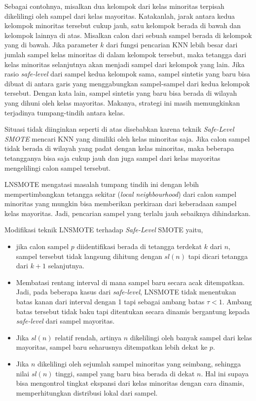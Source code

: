 Sebagai contohnya, misalkan dua kelompok dari kelas minoritas terpisah
dikelilingi oleh sampel dari kelas mayoritas.
Katakanlah, jarak antara kedua kelompok minoritas tersebut cukup jauh, satu
kelompok berada di bawah dan kelompok lainnya di atas.
Misalkan calon dari sebuah sampel berada di kelompok yang di bawah.
Jika parameter $ k $ dari fungsi pencarian KNN lebih besar dari jumlah sampel
kelas minoritas di dalam kelompok tersebut, maka tetangga dari kelas minoritas
selanjutnya akan menjadi sampel dari kelompok yang lain.
Jika rasio \textit{safe-level} dari sampel kedua kelompok sama, sampel sintetis
yang baru bisa dibuat di antara garis yang menggabungkan sampel-sampel dari
kedua kelompok tersebut.
Dengan kata lain, sampel sintetis yang baru bisa berada di wilayah yang dihuni
oleh kelas mayoritas.
Makanya, strategi ini masih memungkinkan terjadinya tumpang-tindih antara
kelas.

Situasi tidak diinginkan seperti di atas disebabkan karena teknik
\textit{Safe-Level SMOTE} mencari KNN yang dimiliki oleh kelas minoritas saja.
Jika calon sampel tidak berada di wilayah yang padat dengan kelas minoritas,
maka beberapa tetangganya bisa saja cukup jauh dan juga sampel dari kelas
mayoritas mengelilingi calon sampel tersebut.

LNSMOTE mengatasi masalah tumpang tindih ini dengan lebih mempertimbangkan
tetangga sekitar
(\textit{local neighbourhood})
dari calon sampel minoritas yang mungkin bisa memberikan perkiraan dari
keberadaan sampel kelas mayoritas.
Jadi, pencarian sampel yang terlalu jauh sebaiknya dihindarkan.

Modifikasi teknik LNSMOTE terhadap \textit{Safe-Level} SMOTE yaitu,
\begin{itemize}
\item jika calon sampel $ p $ diidentifikasi berada di tetangga terdekat $ k
$ dari $ n $, sampel tersebut tidak langsung dihitung dengan $ sl(n) $ tapi
dicari tetangga dari $ k + 1 $ selanjutnya.
\item Membatasi rentang interval di mana sampel baru secara acak ditempatkan.
Jadi, pada beberapa kasus dari \textit{safe-level}, LNSMOTE tidak menentukan
batas kanan dari interval dengan 1 tapi sebagai ambang batas $\tau < 1$.
Ambang batas tersebut tidak baku tapi ditentukan secara dinamis bergantung
kepada \textit{safe-level} dari sampel mayoritas.
\item Jika $ sl(n) $ relatif rendah, artinya $ n $ dikelilingi oleh banyak
sampel dari kelas mayoritas, sampel baru seharusnya ditempatkan lebih dekat ke
$ p $.
\item Jika $ n $ dikelilingi oleh sejumlah sampel minoritas yang seimbang,
sehingga nilai $ sl(n) $ tinggi, sampel yang baru bisa berada di dekat $ n $.
Hal ini supaya bisa mengontrol tingkat ekspansi dari kelas minoritas dengan
cara dinamis, memperhitungkan distribusi lokal dari sampel.
\end{itemize}
